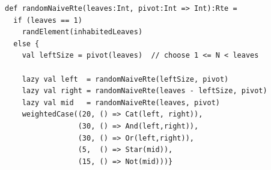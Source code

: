 \begin{lstlisting}[style=scalaioScala]
def randomNaiveRte(leaves:Int, pivot:Int => Int):Rte =
  if (leaves == 1)
    randElement(inhabitedLeaves)
  else {
    val leftSize = pivot(leaves)  // choose 1 <= N < leaves

    lazy val left  = randomNaiveRte(leftSize, pivot)
    lazy val right = randomNaiveRte(leaves - leftSize, pivot)
    lazy val mid   = randomNaiveRte(leaves, pivot)
    weightedCase((20, () => Cat(left, right)),
                 (30, () => And(left,right)),
                 (30, () => Or(left,right)),
                 (5,  () => Star(mid)),
                 (15, () => Not(mid)))}
\end{lstlisting}
